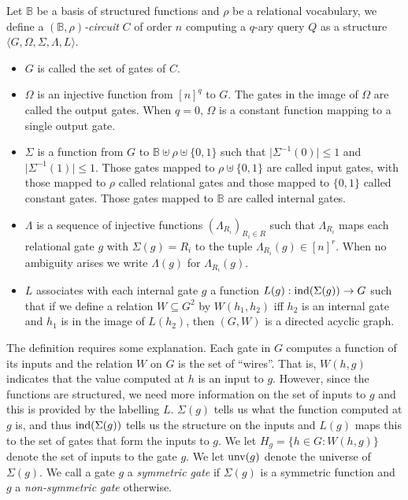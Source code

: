 \documentclass[a4paper,UKenglish]{lipics-v2018}
\begin{document}
\begin{definition}
  Let $\mathbb{B}$ be a basis of structured functions and $\rho$ be a relational
  vocabulary, we define a \emph{$(\mathbb{B}, \rho)$-circuit} $C$ of order $n$
  computing a $q$-ary query $Q$ as a structure $\langle G, \Omega, \Sigma,
  \Lambda, L \rangle$.
  \begin{itemize}
    \setlength\itemsep{0mm}
  \item $G$ is called the set of gates of
    $C$.%
  \item $\Omega$ is an injective function from $[n]^q$ to $G$. The gates in the
    image of $\Omega$ are called the output gates. When $q = 0$, $\Omega$ is a
    constant function mapping to a single output gate.
  \item $\Sigma$ is a function from $G$ to $\mathbb{B} \uplus \rho \uplus
    \{0,1\} $ such that $\vert \Sigma^{-1} (0) \vert \leq 1$ and $\vert
    \Sigma^{-1} (1) \vert \leq 1$. Those gates mapped to $\rho \uplus \{0,1\}$
    are called input gates, with those mapped to $\rho$ called relational gates
    and those mapped to $\{0,1\}$ called constant gates. Those gates mapped to
    $\mathbb{B}$ are called internal gates.
  \item $\Lambda$ is a sequence of injective functions $(\Lambda_{R_i})_{R_i \in
      R}$ such that $\Lambda_{R_i}$ maps each relational gate $g$ with $\Sigma
    (g) = R_i$ to the tuple $\Lambda_{R_i} (g) \in [n]^{r}$. When no ambiguity
    arises we write $\Lambda (g)$ for $\Lambda_{R_i} (g)$.
  \item $L$ associates with each internal gate $g$ a function $L(g):
    \text{\upshape ind}(\Sigma(g)) \rightarrow G$ such that if we define a relation $W
    \subseteq G^{2}$ by $W(h_1,h_2)$ iff $h_2$ is an internal gate and $h_1$ is
    in the image of $L(h_2)$, then $(G, W)$ is a directed acyclic graph.
  \end{itemize}
\end{definition}

The definition requires some explanation. Each gate in $G$ computes a function
of its inputs and the relation $W$ on $G$ is the set of ``wires''. That is,
$W(h,g)$ indicates that the value computed at $h$ is an input to $g$. However,
since the functions are structured, we need more information on the set of
inputs to $g$ and this is provided by the labelling $L$. $\Sigma(g)$ tells us
what the function computed at $g$ is, and thus $\text{\upshape ind}(\Sigma(g))$ tells us the
structure on the inputs and $L(g)$ maps this to the set of gates that form the
inputs to $g$. We let $H_g = \{h \in G : W(h,g)\}$ denote the set of inputs to
the gate $g$. We let $\text{unv}(g)$ denote the universe of $\Sigma(g)$. We call
a gate $g$ a \emph{symmetric gate} if $\Sigma(g)$ is a symmetric function and
$g$ a \emph{non-symmetric gate} otherwise.
\end{document}
